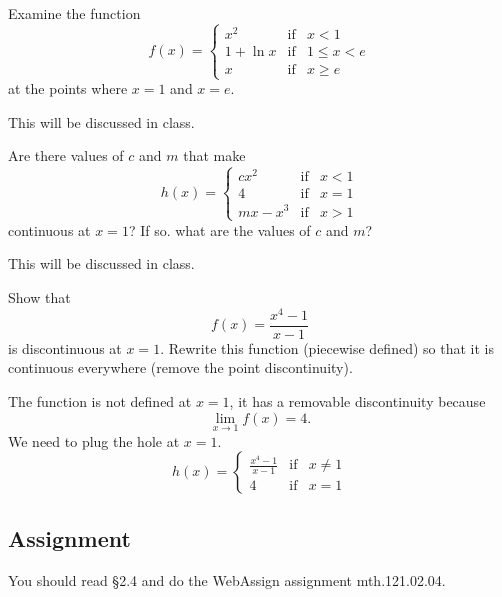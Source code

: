 \documentclass[12pt,addpoints, answers, fleqn]{exam}
\begin{document}
\begin{questions}

\question Examine the function
\[
f \left( x \right) = \left\{ {\begin{array}{lcl}
  {x^2} & {\mbox{if}} & x < 1\\
  {1 + \ln x} & {\mbox{if}} & 1 \leq x < e\\
  {x} & {\mbox{if}} & x \geq e
\end{array}} \right.
\]
at the points where $x=1$ and $x=e$.

\begin{solution}
This will be discussed in class.
\end{solution}

\question Are there values of $c$ and $m$ that make
\[
h \left( x \right) = \left\{ {\begin{array}{lcl}
  {cx^2} & {\mbox{if}} & x < 1\\
  {4} & {\mbox{if}} & x=1\\
  {mx-x^3} & {\mbox{if}} & x >1
\end{array}} \right.
\]
continuous at $x=1$? If so. what are the values of $c$ and $m$?

\begin{solution}
This will be discussed in class.
\end{solution}


\question Show that
\[
f \left( x \right) = \frac{x^4 - 1}{x-1}
\]
is discontinuous at $x=1$. Rewrite this function (piecewise defined) so that it is continuous everywhere (remove the point discontinuity).

\begin{solution}
The function is not defined at $x=1$, it has a removable discontinuity because
\[
\lim_{x \to 1} f \left( x \right) = 4.
\]
We need to plug the hole at $x=1$.
\[
h \left( x \right) = \left\{ {\begin{array}{ccl}
 { \displaystyle \frac{x^4 - 1}{x-1}} & {\mbox{if}} & x \neq 1\\[10pt]
  {4} & {\mbox{if}} & x=1
\end{array}} \right.
\]
\end{solution}

\end{questions}






\subsection{Assignment}
You should read \S  2.4 and do the WebAssign assignment mth.121.02.04.
\vfill
\pagebreak
\end{document}
